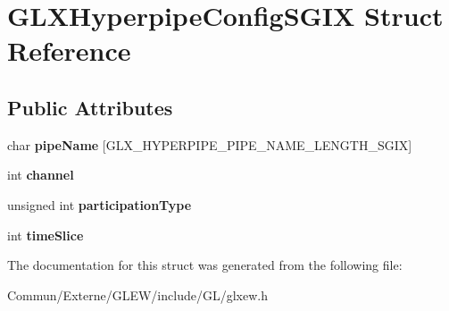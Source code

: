 \hypertarget{struct_g_l_x_hyperpipe_config_s_g_i_x}{}\section{G\+L\+X\+Hyperpipe\+Config\+S\+G\+IX Struct Reference}
\label{struct_g_l_x_hyperpipe_config_s_g_i_x}
\subsection*{Public Attributes}
\begin{DoxyCompactItemize}
\item 
char {\bfseries pipe\+Name} \mbox{[}G\+L\+X\+\_\+\+H\+Y\+P\+E\+R\+P\+I\+P\+E\+\_\+\+P\+I\+P\+E\+\_\+\+N\+A\+M\+E\+\_\+\+L\+E\+N\+G\+T\+H\+\_\+\+S\+G\+IX\mbox{]}\hypertarget{struct_g_l_x_hyperpipe_config_s_g_i_x_a9e3748f92005cac81cb44d4c67acccb8}{}\label{struct_g_l_x_hyperpipe_config_s_g_i_x_a9e3748f92005cac81cb44d4c67acccb8}

\item 
int {\bfseries channel}\hypertarget{struct_g_l_x_hyperpipe_config_s_g_i_x_abc812d8796ba89d5de4e33b3532d8335}{}\label{struct_g_l_x_hyperpipe_config_s_g_i_x_abc812d8796ba89d5de4e33b3532d8335}

\item 
unsigned int {\bfseries participation\+Type}\hypertarget{struct_g_l_x_hyperpipe_config_s_g_i_x_a093cfaaec305531f66e1120929b5b01b}{}\label{struct_g_l_x_hyperpipe_config_s_g_i_x_a093cfaaec305531f66e1120929b5b01b}

\item 
int {\bfseries time\+Slice}\hypertarget{struct_g_l_x_hyperpipe_config_s_g_i_x_afe9288e75dc1ae5e0f33eff978d7024d}{}\label{struct_g_l_x_hyperpipe_config_s_g_i_x_afe9288e75dc1ae5e0f33eff978d7024d}

\end{DoxyCompactItemize}


The documentation for this struct was generated from the following file\+:\begin{DoxyCompactItemize}
\item 
Commun/\+Externe/\+G\+L\+E\+W/include/\+G\+L/glxew.\+h\end{DoxyCompactItemize}

